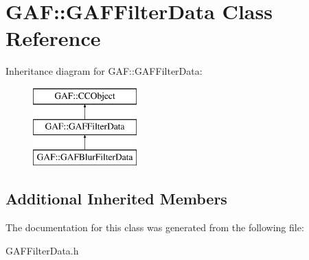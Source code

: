 \hypertarget{class_g_a_f_1_1_g_a_f_filter_data}{\section{G\-A\-F\-:\-:G\-A\-F\-Filter\-Data Class Reference}
\label{class_g_a_f_1_1_g_a_f_filter_data}
}
Inheritance diagram for G\-A\-F\-:\-:G\-A\-F\-Filter\-Data\-:\begin{figure}[H]
\begin{center}
\leavevmode
\includegraphics[height=3.000000cm]{class_g_a_f_1_1_g_a_f_filter_data}
\end{center}
\end{figure}
\subsection*{Additional Inherited Members}


The documentation for this class was generated from the following file\-:\begin{DoxyCompactItemize}
\item 
G\-A\-F\-Filter\-Data.\-h\end{DoxyCompactItemize}
